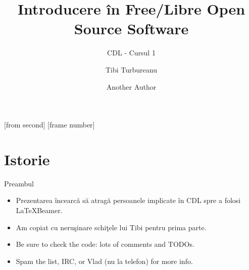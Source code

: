 \documentclass{beamer}
\title[Introducere \^in FLOSS]{Introducere \^in Free/Libre Open Source Software}
\subtitle{CDL - Cursul 1}
\institute{ROSEdu}
\author{Tibi Turbureanu \and Another Author}
\begin{document}
[from second]
[frame number]

\frame{\titlepage}

\frame{\tableofcontents}

\section{Istorie}

\frame{\tableofcontents[currentsection]}

\begin{frame}{Preambul}
  \begin{itemize} %
  \item Prezentarea încearcă să atragă persoanele implicate în CDL spre a folosi
    \LaTeX Beamer.
  \item Am copiat cu neruşinare schiţele lui Tibi pentru prima parte.
  \item Be sure to check the code: lots of comments and TODOs.
  \item Spam the list, IRC, or Vlad (nu la telefon) for more info.
  \end{itemize}
\end{frame}
\end{document}
